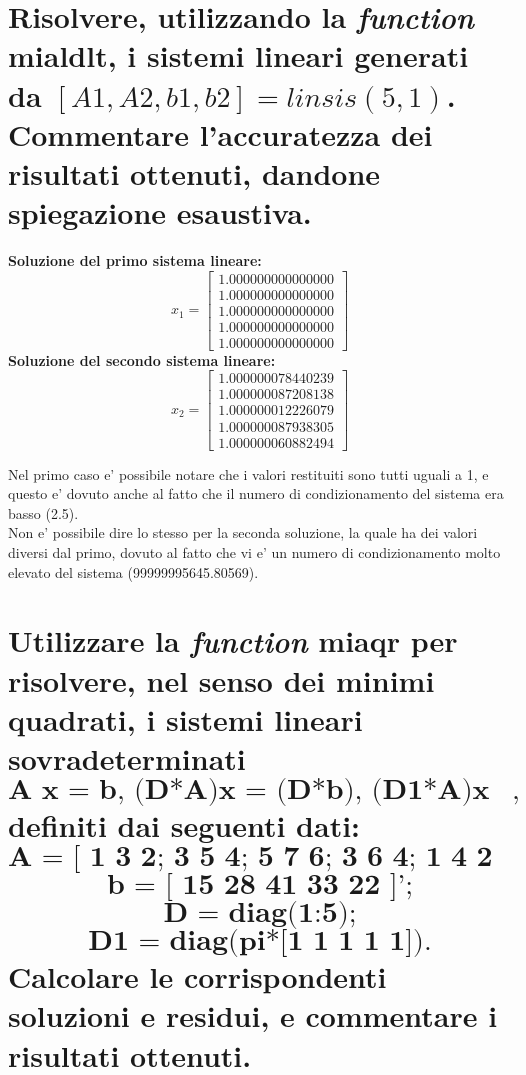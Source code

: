 \documentclass[10pt,a4paper]{article}
\begin{document}
\section{Risolvere, utilizzando la \textit{function} \textbf{mialdlt}, i sistemi
  lineari generati da \textbf{$ [A1,A2,b1,b2]=linsis(5,1)$}.
  \\
  Commentare l'accuratezza
  dei risultati ottenuti, dandone spiegazione esaustiva.}

\textbf{Soluzione del primo sistema lineare:}
\[
  x_1 =
  \begin{bmatrix}
    1.000000000000000 \\
    1.000000000000000 \\
    1.000000000000000 \\
    1.000000000000000 \\
    1.000000000000000
  \end{bmatrix}
\]
\textbf{Soluzione del secondo sistema lineare:}
\[
  x_2 =
  \begin{bmatrix}
    1.000000078440239 \\
    1.000000087208138 \\
    1.000000012226079 \\
    1.000000087938305 \\
    1.000000060882494
  \end{bmatrix}
\]

Nel primo caso e' possibile notare che i valori restituiti sono tutti uguali a 1,
e questo e' dovuto anche al fatto che il numero di condizionamento del sistema
era basso (2.5).
\\
Non e' possibile dire lo stesso per la seconda soluzione, la quale ha dei valori
diversi dal primo, dovuto al fatto che vi e' un numero di condizionamento
molto elevato del sistema (99999995645.80569).

\section{Utilizzare la \textit{function} \textbf{miaqr} per risolvere, nel senso dei
  minimi quadrati, i sistemi lineari sovradeterminati
  $$ \textbf{A x = b, (D*A)x = (D*b), (D1*A)x = (D1*b)}, $$
  definiti dai seguenti dati:
  $$ \textbf{A = [ 1 3 2; 3 5 4; 5 7 6; 3 6 4; 1 4 2 ];} $$
  $$ \textbf{b = [ 15 28 41 33 22 ]';} $$
  $$ \textbf{D = diag(1:5);} $$
  $$ \textbf{D1 = diag(pi*[1 1 1 1 1]).} $$
  Calcolare le corrispondenti soluzioni e residui, e commentare i risultati ottenuti.}
\end{document}

